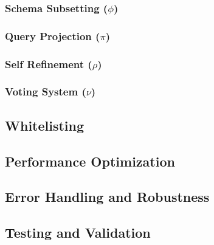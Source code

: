 \subsubsection{Schema Subsetting ($\phi$)}

\subsubsection{Query Projection ($\pi$)}

\subsubsection{Self Refinement ($\rho$)}

\subsubsection{Voting System ($\nu$)}

\subsection{Whitelisting}\label{implementation:whitelisting}

\subsection{Performance Optimization}

\subsection{Error Handling and Robustness}

\subsection{Testing and Validation}

\newpage
